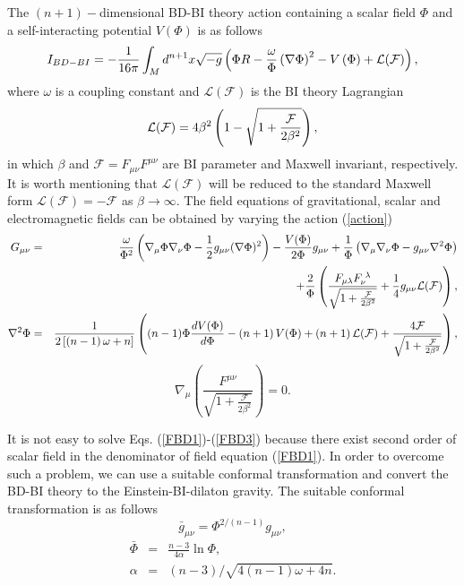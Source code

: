 \documentclass[aps,onecolumn ]{revtex4}
\begin{document}
The $(n+1)-$dimensional BD-BI theory action containing a scalar
field $\Phi
$ and a self-interacting potential $V(\Phi )$ is as follows%
\begin{equation}
I_{BD-BI}=-\frac{1}{16\pi }\int_{M}d^{n+1}x\sqrt{-g}\left( \Phi R-\frac{%
\omega }{\Phi }\left( \nabla \Phi \right) ^{2}-V\left( \Phi \right) +%
\mathcal{L}(\mathcal{F})\right),  \label{action}
\end{equation}
where $\omega $ is a coupling constant and $\mathcal{L}(\mathcal{F})$ is the
BI theory Lagrangian
\begin{equation}
\mathcal{L}(\mathcal{F})=4\beta ^{2}\left( 1-\sqrt{1+\frac{\mathcal{F}}{%
2\beta ^{2}}}\right),  \label{BI-Lagrangian}
\end{equation}
in which $\beta$ and $\mathcal{F}=F_{\mu \nu}F^{\mu \nu}$ are BI parameter
and Maxwell invariant, respectively. It is worth mentioning that $\mathcal{L}%
(\mathcal{F})$ will be reduced to the standard Maxwell form $\mathcal{L}(%
\mathcal{F})=-\mathcal{F}$ as $\beta \rightarrow \infty $. The field
equations of gravitational, scalar and electromagnetic fields can be
obtained by varying the action (\ref{action})
\begin{eqnarray}
G_{\mu \nu } &=&\frac{\omega }{\Phi ^{2}}\left( \nabla _{\mu }\Phi \nabla
_{\nu }\Phi -\frac{1}{2}g_{\mu \nu }(\nabla \Phi )^{2}\right) -\frac{V(\Phi )%
}{2\Phi }g_{\mu \nu }+\frac{1}{\Phi }\left( \nabla _{\mu }\nabla _{\nu }\Phi
-g_{\mu \nu }\nabla ^{2}\Phi \right)  \nonumber \\
&&+\frac{2}{\Phi }\left( \frac{F_{\mu \lambda }F_{\nu }^{\text{ }\lambda }}{%
\sqrt{1+\frac{\mathcal{F}}{2\beta ^{2}}}}+\frac{1}{4}g_{\mu \nu }\mathcal{L}(%
\mathcal{F})\right),  \label{FBD1} \\
\nabla ^{2}\Phi &=&\frac{1}{2\left[ \left( n-1\right) \omega +n\right] }%
\left( (n-1)\Phi \frac{dV(\Phi )}{d\Phi }-\left( n+1\right) V(\Phi )+\left(
n+1\right) \mathcal{L}(\mathcal{F})+\frac{4\mathcal{F}}{\sqrt{1+\frac{%
\mathcal{F}}{2\beta ^{2}}}}\right),  \label{FBD2}
\end{eqnarray}
\begin{equation}
\nabla _{\mu }\left( \frac{F^{\mu \nu }}{\sqrt{1+\frac{\mathcal{F}}{2\beta
^{2}}}}\right) =0.  \label{FBD3}
\end{equation}

It is not easy to solve Eqs. (\ref{FBD1})-(\ref{FBD3}) because
there exist second order of scalar field in the denominator of
field equation (\ref{FBD1}). In order to overcome such a problem,
we can use a suitable conformal transformation and convert the
BD-BI theory to the Einstein-BI-dilaton gravity. The suitable
conformal transformation is as follows
\begin{equation}
\bar{g}_{\mu \nu }=\Phi ^{2/(n-1)}g_{\mu \nu },  \label{CT}
\end{equation}
\begin{eqnarray}
\bar{\Phi} &=&\frac{n-3}{4\alpha }\ln \Phi ,  \label{Phibar} \\
\alpha &=&(n-3)/\sqrt{4(n-1)\omega +4n}.  \label{alpha}
\end{eqnarray}
\end{document}
